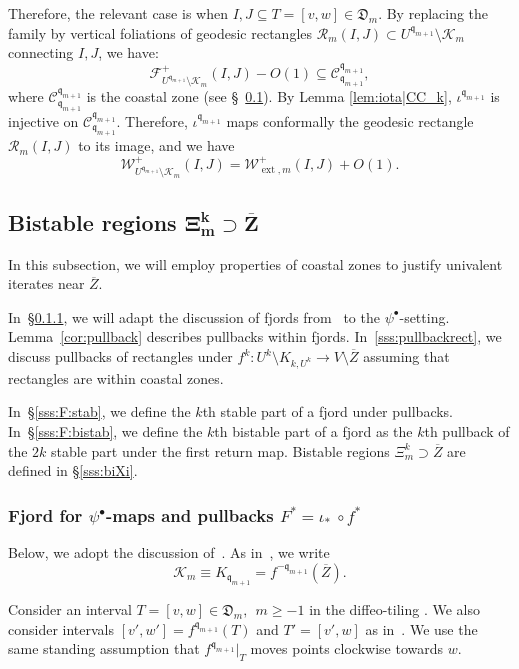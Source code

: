 \documentclass{amsart}
\renewcommand{\sp}{{\ \ }}
\newcommand{\1}{{\mathbb 1 }}
\newcommand{\ext}{{\operatorname{ext}}}
\newcommand{\Fam}{{\mathcal F}}
\newcommand{\Width}{{\mathcal W}}
\newcommand\RR{\mathcal{R}}
\newcommand{\qq}{\mathfrak{q}}
\newcommand{\Dbb}{{\mathfrak{D}}}
\theoremstyle{remark}
\numberwithin{equation}{section}
\theoremstyle{definition}
\newcommand{\filled}{{\mathcal {K} }}
\newcommand{\CC}{{\mathcal C}}
\begin{document}
Therefore, the relevant case is when $I, J \subseteq T = [v,w]\in \Dbb_m$. By replacing the family by vertical foliations of geodesic rectangles $\RR_m(I,J)\subset U^{\qq_{m+1}}\setminus \filled_m$ connecting $I, J$, we have:
\[\Fam^+_{U^{\qq_{m+1}}\setminus \filled_m}(I,J)- O(1) \subseteq \CC^{\qq_{m+1}}_{\qq_{m+1}},\]
where $\CC^{\qq_{m+1}}_{\qq_{m+1}}$ is the coastal zone (see \S~\ref{subsec:pullback}).
By Lemma \ref{lem:iota|CC_k}, $\iota^{\qq_{m+1}}$ is injective on $\CC^{\qq_{m+1}}_{\qq_{m+1}}$. Therefore, $\iota^{\qq_{m+1}}$ maps conformally the geodesic rectangle $\RR_m(I,J)$ to its image, and we have
$$
\Width^+_{U^{\qq_{m+1}}\setminus \filled_m}(I,J) = \Width^+_{\ext, m}(I,J) + O(1).
$$





\subsection{Bistable regions $\boldsymbol {\Xi^k_m\supset \overline Z}$}\label{subsec:pullback} In this subsection, we will employ properties of coastal zones to justify univalent iterates near $\overline Z$. 

In~\S\ref{sss:F^*}, we will adapt the discussion of fjords from~\cite[\S2.1.7]{DL22} to the $\psi^\bullet$-setting.  Lemma~\ref{cor:pullback} describes pullbacks within fjords. In~\ref{sss:pullbackrect}, we discuss pullbacks of rectangles under $f^k: U^k\setminus K_{k, U^k} \longrightarrow V\setminus \overline{Z}$ assuming that rectangles are within coastal zones.

In~\S\ref{sss:F:stab}, we define the $k$th stable part of a fjord under pullbacks. In~\S\ref{sss:F:bistab}, we define the $k$th bistable part of a fjord as the $k$th pullback of the $2k$ stable part under the first return map. Bistable regions $\Xi_m^k \supset \overline Z$ are defined in \S\ref{sss:biXi}.




\subsubsection{Fjord for $\psi^\bullet$-maps and pullbacks $F^*=\iota_*\ \circ f^*$}\label{sss:F^*} Below, we adopt the discussion of~\cite[\S2.1.7]{DL22}. As in~\cite{DL22}, we write 
\[\filled_m\equiv K_{\qq_{m+1}}=f^{-\qq_{m+1}}(\overline Z).\]

Consider an interval $T=[v,w]\in \Dbb_m, \sp m\ge -1$ in the diffeo-tiling \cite[\S2.1.6]{DL22}. We also consider intervals $[v',w']=f^{\qq_{m+1}}(T)$ and $T'=[v',w]$ as in~\cite[\S2.1.7]{DL22}.
We use the same standing assumption that $f^{\qq_{m+1}}|_T$ moves points clockwise towards $w$.
\end{document}
